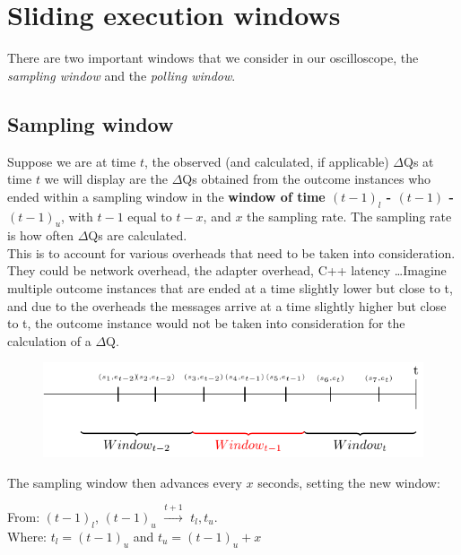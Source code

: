 \section{Sliding execution windows}

    There are two important windows that we consider in our oscilloscope, the \textit{sampling window} and the \textit{polling window}.

    \subsection{Sampling window}
    Suppose we are at time $t$, the observed (and calculated, if applicable) $\Delta$Qs at time $t$ we will display are the $\Delta$Qs obtained from the outcome instances who ended within a sampling window in the \textbf{window of time $(t-1)_{l}$ - $(t-1)$ - $(t-1)_u$}, with $t-1$ equal to $t - x$, and $x$ the sampling rate. The sampling rate is how often $\Delta$Qs are calculated. \\
    This is to account for various overheads that need to be taken into consideration. They could be network overhead, the adapter overhead, C++ latency \dots Imagine multiple outcome instances that are ended at a time slightly lower but close to t, and due to the overheads the messages arrive at a time slightly higher but close to t, the outcome instance would not be taken into consideration for the calculation of a $\Delta$Q.
    
    \begin{figure}[H]
        \begin{center}
            \includegraphics{tikz/window.pdf}
        \end{center}
    \end{figure}
    
    The sampling window then advances every $x$ seconds, setting the new window: 
    \begin{center}
        From: $(t-1)_l$, $(t-1)_u$ $\xrightarrow{t + 1}$ $t_l, t_u$. \\
        Where: $t_l = (t-1)_u$ and $t_u = (t-1)_u + x$ 
    \end{center}

